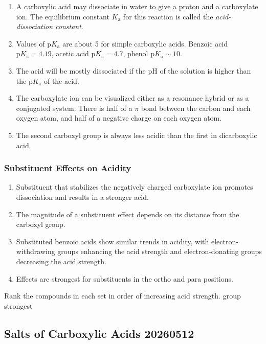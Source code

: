 \begin{enumerate}
    \item A carboxylic acid may dissociate in water to give a proton and a carboxylate ion. The equilibrium constant $K_{\mathrm{a}}$ for this reaction is called the \textit{acid-dissociation constant}.
    \item Values of $\mathrm{p}K_\mathrm{a}$ are about 5 for simple carboxylic acids. Benzoic acid $\mathrm{p}K_\mathrm{a} = 4.19$, acetic acid $\mathrm{p}K_\mathrm{a} = 4.7$, phenol $\mathrm{p}K_\mathrm{a} \sim 10$.
    \item The acid will be mostly dissociated if the $\mathrm{pH}$ of the solution is higher than the $\mathrm{p}K_\mathrm{a}$ of the acid.
    \item The carboxylate ion can be visualized either as a resonance hybrid  or as a conjugated system. There is half of a $\pi$ bond between the carbon and each oxygen atom, and half of a negative charge on each oxygen atom.
    \item The second carboxyl group is always less acidic than the first in dicarboxylic acid.
\end{enumerate}

\subsubsection{Substituent Effects on Acidity}

\begin{enumerate}
    \item Substituent that stabilizes the negatively charged carboxylate ion promotes dissociation and results in a stronger acid.
    \item The magnitude of a substituent effect depends on its distance from the carboxyl group.
    \item Substituted benzoic acids show similar trends in acidity, with electron-withdrawing groups enhancing the acid strength and electron-donating groups decreasing the acid strength.
    \item Effects are strongest for substituents in the ortho and para positions.
\end{enumerate}

\begin{example} %
    Rank the compounds in each set in order of increasing acid strength.
     group strongest
\end{example}

\subsection{Salts of Carboxylic Acids 20260512}

